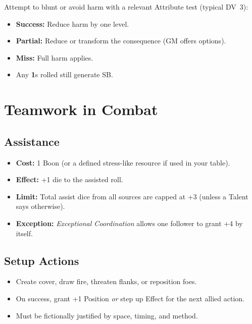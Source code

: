 Attempt to blunt or avoid harm with a relevant Attribute test (typical DV~3):
\begin{itemize}
  \item \textbf{Success:} Reduce harm by one level.
  \item \textbf{Partial:} Reduce or transform the consequence (GM offers options).
  \item \textbf{Miss:} Full harm applies.
  \item Any \textbf{1}s rolled still generate SB. 
\end{itemize}

\section{Teamwork in Combat}
\label{sec:teamwork}

\subsection{Assistance}
\label{subsec:assistance}

\begin{itemize}
  \item \textbf{Cost:} 1 Boon (or a defined stress-like resource if used in your table). 
  \item \textbf{Effect:} +1 die to the assisted roll.
  \item \textbf{Limit:} Total assist dice from all sources are capped at +3 (unless a Talent says otherwise).
  \item \textbf{Exception:} \emph{Exceptional Coordination} allows one follower to grant +4 by itself.
\end{itemize}

\subsection{Setup Actions}
\label{subsec:setup-actions}

\begin{itemize}
  \item Create cover, draw fire, threaten flanks, or reposition foes.
  \item On success, grant +1 Position \emph{or} step up Effect for the next allied action.
  \item Must be fictionally justified by space, timing, and method.
\end{itemize}

